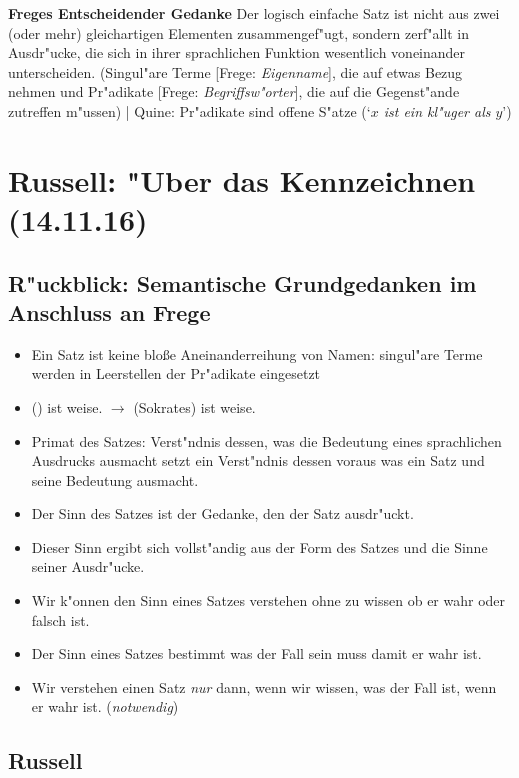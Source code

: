 \documentclass[]{scrartcl}
\begin{document}
\textbf{Freges Entscheidender Gedanke} Der logisch einfache Satz ist nicht aus zwei (oder mehr) gleichartigen Elementen zusammengef"ugt, sondern zerf"allt in Ausdr"ucke, die sich in ihrer sprachlichen Funktion wesentlich voneinander unterscheiden. (Singul"are Terme [Frege: \emph{Eigenname}], die auf etwas Bezug nehmen und Pr"adikate [Frege: \emph{Begriffsw"orter}], die auf die Gegenst"ande zutreffen m"ussen) | Quine: Pr"adikate sind offene S"atze (`\emph{$x$ ist ein kl"uger als $y$}')

\section{Russell: "Uber das Kennzeichnen\\(14.11.16)}

\subsection{R"uckblick: Semantische Grundgedanken im Anschluss an Frege}

\begin{itemize}
  \item Ein Satz ist keine blo\ss e Aneinanderreihung von Namen: singul"are Terme werden in Leerstellen der Pr"adikate eingesetzt
  \item () ist weise. $\rightarrow$ (Sokrates) ist weise.
  \item Primat des Satzes: Verst"ndnis dessen, was die Bedeutung eines sprachlichen Ausdrucks ausmacht setzt ein Verst"ndnis dessen voraus was ein Satz und seine Bedeutung ausmacht.
  \item Der Sinn des Satzes ist der Gedanke, den der Satz ausdr"uckt.
  \item Dieser Sinn ergibt sich vollst"andig aus der Form des Satzes und die Sinne seiner Ausdr"ucke.
  \item Wir k"onnen den Sinn eines Satzes verstehen ohne zu wissen ob er wahr oder falsch ist.
  \item Der Sinn eines Satzes bestimmt was der Fall sein muss damit er wahr ist.
  \item Wir verstehen einen Satz \emph{nur} dann, wenn wir wissen, was der Fall ist, wenn er wahr ist. (\emph{notwendig})
\end{itemize}

\subsection{Russell}
\end{document}
